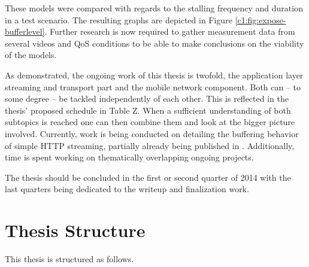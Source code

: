 These models were compared with regards to the stalling frequency and duration in a test scenario. The resulting graphs are depicted in Figure \ref{c1:fig:expose-bufferlevel}. Further research is now required to gather measurement data from several videos and QoS conditions to be able to make conclusions on the viability of the models.




As demonstrated, the ongoing work of this thesis is twofold, the application layer streaming and transport part and the mobile network component. Both can -- to some degree -- be tackled independently of each other. This is reflected in the thesis' proposed schedule in Table Z. When a sufficient understanding of both subtopics is reached one can then combine them and look at the bigger picture involved. Currently, work is being conducted on detailing the buffering behavior of simple HTTP streaming, partially already being published in \cite{metzger2011delivery}. Additionally, time is spent working on thematically overlapping ongoing projects.

The thesis should be concluded in the first or second quarter of 2014 with the last quarters being dedicated to the writeup and finalization work.



\section{Thesis Structure}

This thesis is structured as follows.







